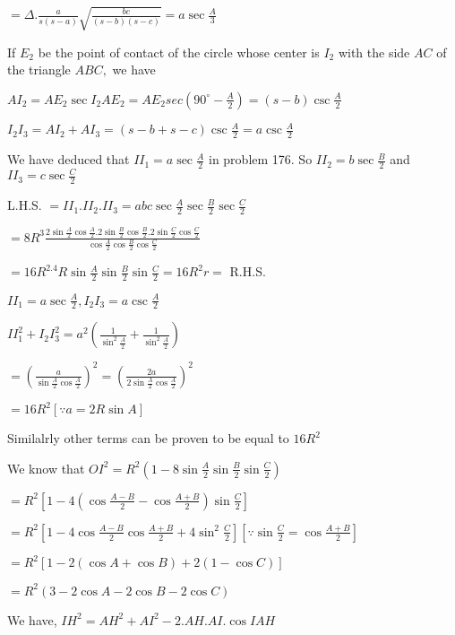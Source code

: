   $= \Delta .\frac{a}{s(s - a)}\sqrt{\frac{bc}{(s - b)(s - c)}} = a\sec\frac{A}{3}$

\item If $E_2$ be the point of contact of the circle whose center is $I_2$ with the side $AC$ of the triangle
  $ABC,$ we have

  $AI_2 = AE_2\sec I_2AE_2 = AE_2sec\left(90^\circ - \frac{A}{2}\right) = (s - b)\csc \frac{A}{2}$

  $I_2I_3 = AI_2 + AI_3 = (s - b + s - c)\csc\frac{A}{2} = a\csc\frac{A}{2}$

\item We have deduced that $II_1 = a\sec\frac{A}{2}$ in problem 176. So $II_2 = b\sec\frac{B}{2}$ and $II_3 =
  c\sec\frac{C}{2}$

  L.H.S. $= II_1.II_2.II_3 = abc\sec\frac{A}{2}\sec\frac{B}{2}\sec\frac{C}{2}$

  $=
  8R^3\frac{2\sin\frac{A}{2}\cos\frac{A}{2}.2\sin\frac{B}{2}\cos\frac{B}{2}.2\sin\frac{C}{2}\cos\frac{C}{2}}{\cos\frac{A}{2}\cos\frac{B}{2}\cos\frac{C}{2}}$

  $= 16R^2.4R\sin\frac{A}{2}\sin\frac{B}{2}\sin\frac{C}{2} = 16R^2r =$ R.H.S.

\item $II_1 = a\sec\frac{A}{2}, I_2I_3 = a\csc\frac{A}{2}$

  $II_1^2 + I_2I_3^2 = a^2\left(\frac{1}{\sin^2\frac{A}{2}} + \frac{1}{\sin^2\frac{A}{2}}\right)$

  $= \left(\frac{a}{\sin\frac{A}{2}\cos\frac{A}{2}}\right)^2 = \left(\frac{2a}{2\sin\frac{A}{2}\cos\frac{A}{2}}\right)^2$

  $= 16R^2 [\because a = 2R\sin A]$

  Similalrly other terms can be proven to be equal to $16R^2$

\item We know that $OI^2 = R^2\left(1 - 8\sin\frac{A}{2}\sin\frac{B}{2}\sin\frac{C}{2}\right)$

  $= R^2\left[1 - 4\left(\cos \frac{A - B}{2} - \cos\frac{A + B}{2}\right)\sin\frac{C}{2}\right]$

  $= R^2\left[1 - 4\cos\frac{A - B}{2}\cos\frac{A + B}{2} + 4\sin^2\frac{C}{2}\right][\because \sin \frac{C}{2} = \cos\frac{A + B}{2}]$

  $= R^2\left[1 - 2(\cos A + \cos B) + 2(1 - \cos C)\right]$

  $=R^2(3 - 2\cos A - 2\cos B - 2\cos C)$

\item We have, $IH^2 = AH^2 + AI^2 - 2.AH.AI.\cos IAH$

